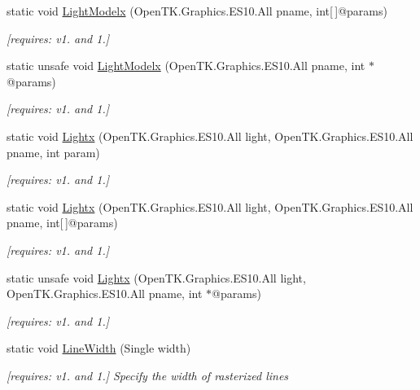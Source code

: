 \begin{DoxyCompactItemize}
static void \hyperlink{class_open_t_k_1_1_graphics_1_1_e_s10_1_1_g_l_a72c94659b53985f3b9624b407dd4e70f}{Light\-Modelx} (Open\-T\-K.\-Graphics.\-E\-S10.\-All pname, int\mbox{[}$\,$\mbox{]}@params)
\begin{DoxyCompactList}\small\item\em \mbox{[}requires\-: v1. and 1.\mbox{]}\end{DoxyCompactList}\item 
static unsafe void \hyperlink{class_open_t_k_1_1_graphics_1_1_e_s10_1_1_g_l_a6ef12bb29d215caad8f5d9890b2f4bf8}{Light\-Modelx} (Open\-T\-K.\-Graphics.\-E\-S10.\-All pname, int $\ast$@params)
\begin{DoxyCompactList}\small\item\em \mbox{[}requires\-: v1. and 1.\mbox{]}\end{DoxyCompactList}\item 
static void \hyperlink{class_open_t_k_1_1_graphics_1_1_e_s10_1_1_g_l_a755437bd6ad4c2c668e50878b6be8a47}{Lightx} (Open\-T\-K.\-Graphics.\-E\-S10.\-All light, Open\-T\-K.\-Graphics.\-E\-S10.\-All pname, int param)
\begin{DoxyCompactList}\small\item\em \mbox{[}requires\-: v1. and 1.\mbox{]}\end{DoxyCompactList}\item 
static void \hyperlink{class_open_t_k_1_1_graphics_1_1_e_s10_1_1_g_l_adf625698407716b800c7ee4ea6a0dd7f}{Lightx} (Open\-T\-K.\-Graphics.\-E\-S10.\-All light, Open\-T\-K.\-Graphics.\-E\-S10.\-All pname, int\mbox{[}$\,$\mbox{]}@params)
\begin{DoxyCompactList}\small\item\em \mbox{[}requires\-: v1. and 1.\mbox{]}\end{DoxyCompactList}\item 
static unsafe void \hyperlink{class_open_t_k_1_1_graphics_1_1_e_s10_1_1_g_l_acb5b5dd077819818fea7b66641d1d364}{Lightx} (Open\-T\-K.\-Graphics.\-E\-S10.\-All light, Open\-T\-K.\-Graphics.\-E\-S10.\-All pname, int $\ast$@params)
\begin{DoxyCompactList}\small\item\em \mbox{[}requires\-: v1. and 1.\mbox{]}\end{DoxyCompactList}\item 
static void \hyperlink{class_open_t_k_1_1_graphics_1_1_e_s10_1_1_g_l_a8237894e60ca230b9cd95df20f2bf3a7}{Line\-Width} (Single width)
\begin{DoxyCompactList}\small\item\em \mbox{[}requires\-: v1. and 1.\mbox{]} Specify the width of rasterized lines \end{DoxyCompactList}\item 

\end{DoxyCompactItemize}
